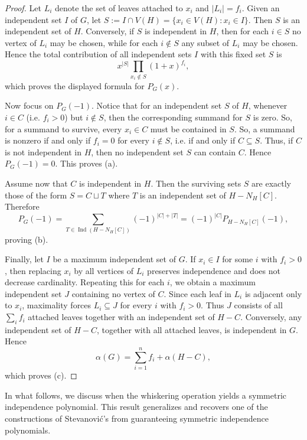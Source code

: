 \documentclass[12pt]{amsart}
\theoremstyle{plain}
\theoremstyle{definition}
\begin{document}
\begin{proof}
Let \(L_i\) denote the set of leaves attached to \(x_i\) and \(|L_i|=f_i\).
Given an independent set \(I\) of \(G\), let $S:=I\cap V(H)=\{ x_i\in V(H): x_i\in I \}$.
Then $S$ is an independent set of \(H\). Conversely, if
$S$ is independent in \(H\), then for each \(i\in S\) no vertex of
\(L_i\) may be chosen, while for each \(i\notin S\) any subset of \(L_i\) may be
chosen. Hence the total contribution of all independent sets \(I\) with this fixed
set \(S\) is
\[
x^{|S|}\prod_{x_i\notin S}(1+x)^{f_i},
\]
which proves the displayed formula for \(P_G(x)\).

Now focus on $P_G(-1)$. Notice that for an independent set $S$ of $H$, whenever  $i\in C$ (i.e. $f_i>0$) but $i\notin S$, then the corresponding summand for $S$   is zero. So, for a summand to survive, every $x_i\in C$ must be contained in $S$.  So, a summand is nonzero if and only if \(f_i=0\) for every
 \(i\notin S\), i.e. if and only if \(C\subseteq S\). Thus, if \(C\) is not
independent in \(H\), then no independent set \(S\) can contain \(C\). Hence
\(P_G(-1)=0\). This proves \textup{(a)}.




Assume now that \(C\) is independent in \(H\). Then the surviving sets \(S\) are
exactly those of the form $S=C\sqcup T$
where \(T\) is an independent set of \(H-N_H[C]\). Therefore
\[
P_G(-1)
=
\sum_{T\in \operatorname{Ind}(H-N_H[C])}(-1)^{|C|+|T|}
=
(-1)^{|C|}P_{H-N_H[C]}(-1),
\]
proving \textup{(b)}.

Finally, let \(I\) be a maximum independent set of \(G\). If \(x_i\in I\) for some \(i\) with
\(f_i>0\), then replacing \(x_i\) by all vertices of \(L_i\) preserves independence and
does not decrease cardinality. Repeating this for each \(i\), we obtain a maximum
independent set \(J\) containing no vertex of \(C\). Since each leaf in \(L_i\) is
adjacent only to \(x_i\), maximality forces \(L_i\subseteq J\) for every \(i\) with
\(f_i>0\). Thus \(J\) consists of all \(\sum_i f_i\) attached leaves together with an
independent set of \(H-C\). Conversely, any independent set of \(H-C\), together with
all attached leaves, is independent in \(G\). Hence
\[
\alpha(G)=\sum_{i=1}^n f_i+\alpha(H-C),
\]
which proves \textup{(c)}.
\end{proof}

In what follows, we discuss when the whiskering operation yields a symmetric independence polynomial. This result generalizes and recovers one of the constructions of Stevanović's  from \cite{Stevanovic} guaranteeing symmetric independence polynomials.
\end{document}
